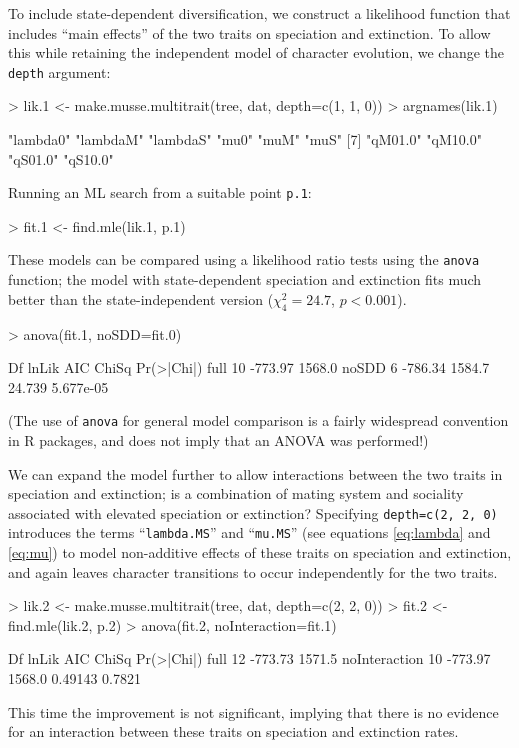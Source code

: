 \documentclass[12pt]{article}
\newenvironment{Schunk}{}{}
\newcommand\code\texttt
\begin{document}
To include state-dependent diversification, we construct a likelihood
function that includes ``main effects'' of the two traits on
speciation and extinction.
%
To allow this while retaining the independent model of character
evolution, we change the \code{depth} argument:
\begin{Schunk}
\begin{Sinput}
> lik.1 <- make.musse.multitrait(tree, dat, depth=c(1, 1, 0))
> argnames(lik.1)
\end{Sinput}
\begin{Soutput}
 [1] "lambda0" "lambdaM" "lambdaS" "mu0"     "muM"     "muS"
 [7] "qM01.0"  "qM10.0"  "qS01.0"  "qS10.0"
\end{Soutput}
\end{Schunk}
Running an ML search from a suitable point \code{p.1}:
\begin{Schunk}
\begin{Sinput}
> fit.1 <- find.mle(lik.1, p.1)
\end{Sinput}
\end{Schunk}
These models can be compared using a likelihood ratio tests using the
\code{anova} function; the model with state-dependent speciation and
extinction fits much better than the state-independent version
($\chi^2_4=24.7$, $p<0.001$).
\begin{Schunk}
\begin{Sinput}
> anova(fit.1, noSDD=fit.0)
\end{Sinput}
\begin{Soutput}
      Df   lnLik    AIC  ChiSq Pr(>|Chi|)
full  10 -773.97 1568.0                  
noSDD  6 -786.34 1584.7 24.739  5.677e-05
\end{Soutput}
\end{Schunk}
(The use of \code{anova} for general model comparison is a fairly
widespread convention in R packages, and does not imply that an ANOVA
was performed!)

We can expand the model further to allow interactions between the two
traits in speciation and extinction; is a combination of mating system
and sociality associated with elevated speciation or extinction?
Specifying \code{depth=c(2, 2, 0)} introduces the terms
``\code{lambda.MS}'' and ``\code{mu.MS}'' (see equations
\ref{eq:lambda} and \ref{eq:mu}) to model non-additive effects of
these traits on speciation and extinction, and again leaves character
transitions to occur independently for the two traits.
\begin{Schunk}
\begin{Sinput}
> lik.2 <- make.musse.multitrait(tree, dat, depth=c(2, 2, 0))
> fit.2 <- find.mle(lik.2, p.2)
> anova(fit.2, noInteraction=fit.1)
\end{Sinput}
\begin{Soutput}
              Df   lnLik    AIC   ChiSq Pr(>|Chi|)
full          12 -773.73 1571.5                   
noInteraction 10 -773.97 1568.0 0.49143     0.7821
\end{Soutput}
\end{Schunk}
This time the improvement is not significant, implying that there is
no evidence for an interaction between these traits on speciation and
extinction rates.
\end{document}
